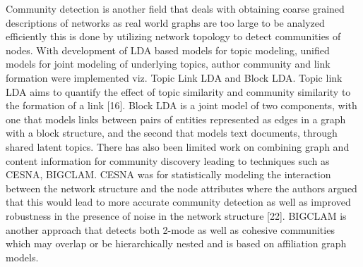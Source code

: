 \documentclass[conference]{IEEEtran}
\begin{document}
Community detection is another field that deals with
obtaining coarse grained descriptions of networks as real
world graphs are too large to be analyzed efficiently this is
done by utilizing network topology to detect communities
of nodes. With development of LDA based models for
topic modeling, unified models for joint modeling of
underlying topics, author community and link formation were
implemented viz. Topic Link LDA and Block LDA. Topic
link LDA aims to quantify the effect of topic similarity
and community similarity to the formation of a link [16].
Block LDA is a joint model of two components, with one
that models links between pairs of entities represented as
edges in a graph with a block structure, and the second that
models text documents, through shared latent topics. There
has also been limited work on combining graph and content
information for community discovery leading to techniques
such as CESNA, BIGCLAM. CESNA was for statistically
modeling the interaction between the network structure
and the node attributes where the authors argued that this
would lead to more accurate community detection as well as
improved robustness in the presence of noise in the network
structure [22]. BIGCLAM is another approach that detects
both 2-mode as well as cohesive communities which may
overlap or be hierarchically nested and is based on affiliation
graph models.



%
%

\end{document}
